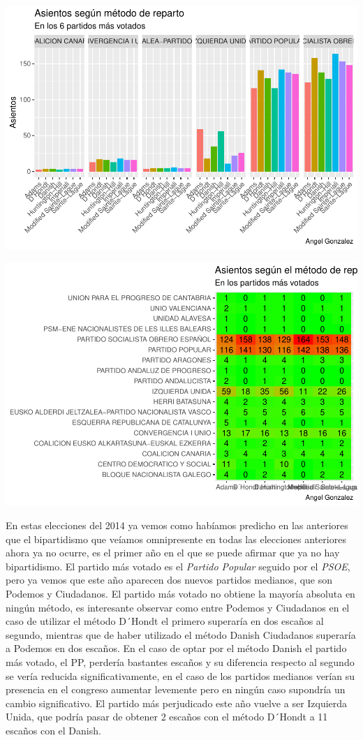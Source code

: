 \documentclass[12pt,a4paper,]{book}
\numberwithin{dummy}{section}
\theoremstyle{ocrenumbox}
\theoremstyle{blacknumex}
\theoremstyle{blacknumbox}
\theoremstyle{ocrenum}
\theoremstyle{ocrenum}
\begin{document}
\begin{center}\includegraphics[width=0.95\linewidth]{figurasR/unnamed-chunk-110-1} \end{center}

\begin{center}\includegraphics[width=0.95\linewidth]{figurasR/unnamed-chunk-110-2} \end{center}

En estas elecciones del 2014 ya vemos como habíamos predicho en las
anteriores que el bipartidismo que veíamos omnipresente en todas las
elecciones anteriores ahora ya no ocurre, es el primer año en el que se
puede afirmar que ya no hay bipartidismo. El partido más votado es el
\emph{Partido Popular} seguido por el \emph{PSOE}, pero ya vemos que
este año aparecen dos nuevos partidos medianos, que son Podemos y
Ciudadanos. El partido más votado no obtiene la mayoría absoluta en
ningún método, es interesante observar como entre Podemos y Ciudadanos
en el caso de utilizar el método D´Hondt el primero superaría en dos
escaños al segundo, mientras que de haber utilizado el método Danish
Ciudadanos superaría a Podemos en dos escaños. En el caso de optar por
el método Danish el partido más votado, el PP, perdería bastantes
escaños y su diferencia respecto al segundo se vería reducida
significativamente, en el caso de los partidos medianos verían su
presencia en el congreso aumentar levemente pero en ningún caso
supondría un cambio significativo. El partido más perjudicado este año
vuelve a ser Izquierda Unida, que podría pasar de obtener 2 escaños con
el método D´Hondt a 11 escaños con el Danish.
\end{document}
